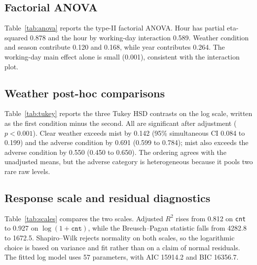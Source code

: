 \documentclass[12pt]{article}
\begin{document}
\subsection{Factorial ANOVA}

Table~\ref{tab:anova} reports the type-II factorial ANOVA. Hour has partial
eta-squared 0.878 and the hour by working-day interaction 0.589. Weather
condition and season contribute 0.120 and 0.168, while year contributes 0.264.
The working-day main effect alone is small (0.001), consistent with the
interaction plot.

\begin{table}[ht]
\centering
\caption{Type-II factorial ANOVA for the log-response model.}
\label{tab:anova}
\resizebox{\columnwidth}{!}{}
\end{table}

\subsection{Weather post-hoc comparisons}

Table~\ref{tab:tukey} reports the three Tukey HSD contrasts on the log scale,
written as the first condition minus the second. All are significant after
adjustment ($p<0.001$). Clear weather exceeds mist by 0.142 (95\% simultaneous
CI 0.084 to 0.199) and the adverse condition by 0.691 (0.599 to 0.784);
mist also exceeds the adverse condition by 0.550 (0.450 to 0.650). The ordering
agrees with the unadjusted means, but the adverse category is heterogeneous
because it pools two rare raw levels.

\begin{table}[ht]
\centering
\caption{Tukey HSD comparisons of pooled weather conditions on the log response.}
\label{tab:tukey}
\resizebox{\columnwidth}{!}{}
\end{table}

\subsection{Response scale and residual diagnostics}

Table~\ref{tab:scales} compares the two scales. Adjusted $R^2$ rises from 0.812 on
\texttt{cnt} to 0.927 on $\log(1+\texttt{cnt})$, while the Breusch--Pagan
statistic falls from 4282.8 to 1672.5. Shapiro--Wilk rejects normality on both
scales, so the logarithmic choice is based on variance and fit rather than on a
claim of normal residuals. The fitted log model uses 57 parameters, with
AIC 15914.2 and BIC 16356.7.
\end{document}
